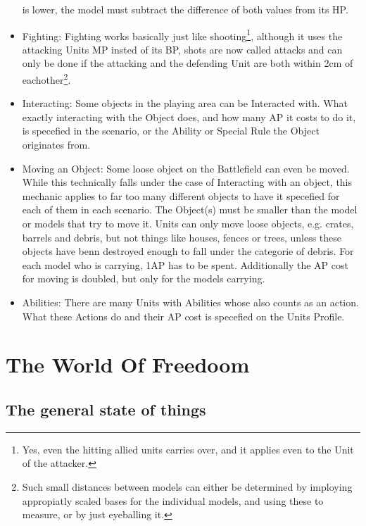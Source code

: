 \documentclass[a4paper,14pt]{book}
\begin{document}
\begin{adjustwidth}{-3cm}{-3cm}
\begin{multicols}{2}
\begin{itemize}
is lower, the model must subtract the difference of both values from its HP. 
	\item Fighting: Fighting works basically just like shooting\footnote{Yes, even the hitting allied units carries over, and it applies even to the Unit of the attacker.}, although it uses the attacking Units MP insted of its BP, shots are now called attacks and can only be done if the attacking and the defending Unit are both within 2cm of eachother\footnote{Such small distances between models can either be determined by imploying appropiatly scaled bases for the individual models, and using these to measure, or by just eyeballing it.}. 
	\item Interacting: Some objects in the playing area can be Interacted with. What exactly interacting with the Object does, and how many AP it costs to do it, is specefied in the scenario, or the Ability or Special Rule the Object originates from.
	\item Moving an Object: Some loose object on the Battlefield can even be moved. While this technically falls under the case of Interacting with an object, this mechanic applies to far too many different objects to have it specefied for each of them in each scenario. The Object(s) must be smaller than the model or models that try to move it.  Units can only move loose objects, e.g. crates, barrels and debris, but not things like houses, fences or trees, unless these objects have benn destroyed enough to fall under the categorie of debris.  For each model who is carrying, 1AP has to be spent. Additionally the AP cost for moving is doubled, but only for the models carrying.
	\item Abilities: There are many Units with Abilities whose also counts as an action. What these Actions do and their AP cost is specefied on the Units Profile.

	
\end{itemize}
\end{multicols}
\end{adjustwidth}


\pagebreak

\chapter{The World Of Freedoom}

\section{The general state of things}
\end{document}

